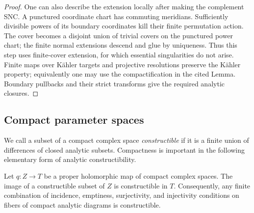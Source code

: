 \begin{proof}
One can also describe the extension locally after making the
complement SNC.  A punctured coordinate chart has commuting
meridians.  Sufficiently divisible powers of its boundary coordinates
kill their finite permutation action.  The cover becomes a disjoint
union of trivial covers on the punctured power chart; the finite
normal extensions descend and glue by uniqueness.  Thus this step
uses finite-cover extension, for which essential singularities do
not arise.  Finite maps over K\"ahler targets and projective
resolutions preserve the K\"ahler property; equivalently one may
use the compactification in the cited Lemma.  Boundary pullbacks
and their strict transforms give the required analytic closures.
\end{proof}

\subsection{Compact parameter spaces}

We call a subset of a compact complex space \emph{constructible} if it
is a finite union of differences of closed analytic subsets.
Compactness is important in the following elementary form of analytic
constructibility.

\begin{lemma}\label{spread:constructible}
Let \(q:Z\to T\) be a proper holomorphic map of compact complex
spaces.  The image of a constructible subset of \(Z\) is
constructible in \(T\).
Consequently, any finite combination of incidence, emptiness,
surjectivity, and injectivity conditions on fibers of compact
analytic diagrams is constructible.
\end{lemma}

